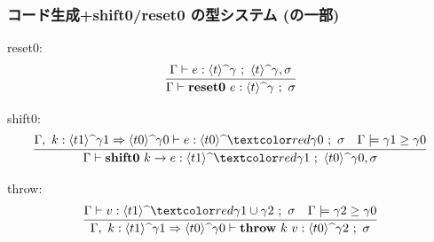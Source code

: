 \begin{frame}[fragile]
  \frametitle{コード生成+shift0/reset0 の型システム\small{ (の一部)}}
  reset0:
  \[
    \infer{\Gamma \vdash \resetz{e} : \codeTs{t}{\gamma} ~;~ \sigma}
    {\Gamma \vdash e : \codeTs{t}{\gamma} ~;~ \codeTs{t}{\gamma}, \sigma}
  \]

  shift0:
  \[
    \infer{\Gamma \vdash \shiftz{k}{e} : \codeTs{t1}{\red{\gamma1}} ~;~ \codeTs{t0}{\gamma0},\sigma}
    {\Gamma,~k:\contT{\codeTs{t1}{\gamma1}}{\codeTs{t0}{\gamma0}}
      \vdash e : \codeTs{t0}{\red{\gamma0}} ~;~ \sigma
      & \Gamma \models \gamma1 \ord \gamma0
    }
  \]

  throw:
  \[
    \infer
    {\Gamma,~k:\contT{\codeTs{t1}{\gamma1}}{\codeTs{t0}{\gamma0}}
      \vdash \throw{k}{v} : \codeTs{t0}{\gamma2} ~;~ \sigma}
    {\Gamma
      \vdash v : \codeTs{t1}{\red{\gamma1 \cup \gamma2}} ~;~ \sigma
      & \Gamma \models \gamma2 \ord \gamma0
    }
  \]
\end{frame}


